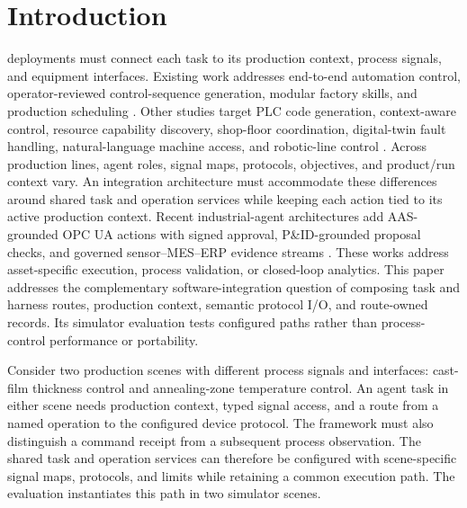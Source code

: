 \section{Introduction}
 deployments must connect each task to its
production context, process signals, and equipment interfaces. Existing work
addresses end-to-end automation control, operator-reviewed control-sequence
generation, modular factory skills, and production scheduling
\cite{xia2025control,huang2026made,koehle2026llmdriven,waseem2026pretrained}.
Other studies target PLC code generation, context-aware control, resource
capability discovery, shop-floor coordination, digital-twin fault handling,
natural-language machine access, and robotic-line control
\cite{liu2026agents4plc,wu2025instructmpc,lim2025llmenabled,zhao2026shopfloor,gill2025llmdt,hofmann2025nlc}.
Across production lines, agent roles, signal maps, protocols, objectives, and
product/run context vary. An integration architecture must accommodate these
differences around shared task and operation services while keeping each
action tied to its active production context. Recent industrial-agent
architectures add AAS-grounded OPC UA actions with signed approval,
P\&ID-grounded proposal checks, and governed sensor--MES--ERP evidence
streams \cite{graul2026aas,schall2026safe,lin2026agentic}. These works address
asset-specific execution, process validation, or closed-loop analytics. This
paper addresses the complementary software-integration question of composing
task and harness routes, production context, semantic protocol I/O, and
route-owned records. Its simulator evaluation tests configured paths rather
than process-control performance or portability.

Consider two production scenes with different process signals and interfaces:
cast-film thickness control and annealing-zone temperature control. An agent
task in either scene needs production context, typed signal access, and a
route from a named operation to the configured device protocol. The framework
must also distinguish a command receipt from a subsequent process
observation. The shared task and operation services can therefore be
configured with scene-specific signal maps, protocols, and limits while
retaining a common execution path. The evaluation instantiates this path in
two simulator scenes.

